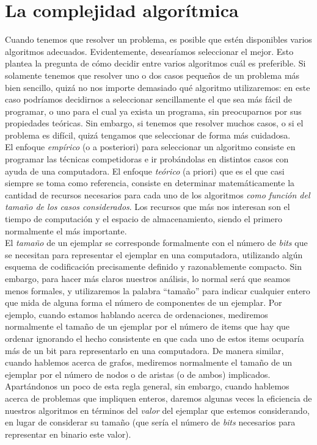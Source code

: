 \chapter{La complejidad algorítmica}
\label{chap:notacion-asintotica}

Cuando tenemos que resolver un problema, es posible que estén disponibles varios algoritmos adecuados. Evidentemente, desearíamos seleccionar el mejor. Esto plantea la pregunta de cómo decidir entre varios algoritmos cuál es preferible. Si solamente tenemos que resolver uno o dos casos pequeños de un problema más bien sencillo, quizá no nos importe demasiado qué algoritmo utilizaremos: en este caso podríamos decidirnos a seleccionar sencillamente el que sea más fácil de programar, o uno para el cual ya exista un programa, sin preocuparnos por sus propiedades teóricas. Sin embargo, si tenemos que resolver muchos casos, o si el problema es difícil, quizá tengamos que seleccionar de forma más cuidadosa.\\

El enfoque \emph{empírico} (o a posteriori) para seleccionar un algoritmo consiste en programar las técnicas competidoras e ir probándolas en distintos casos con ayuda de una computadora. El enfoque \emph{teórico} (a priori) que es el que casi siempre se toma como referencia, consiste en determinar matemáticamente la cantidad de recursos necesarios para cada uno de los algoritmos \emph{como función del tamaño de los casos considerados}. Los recursos que más nos interesan son el tiempo de computación y el espacio de almacenamiento, siendo el primero normalmente el más importante. \\

El \emph{tamaño} de un ejemplar se corresponde formalmente con el número de \emph{bits} que se necesitan para representar el ejemplar en una computadora, utilizando algún esquema de codificación precisamente definido y razonablemente compacto. Sin embargo, para hacer más claros nuestros análisis, lo normal será que seamos menos formales, y utilizaremos la palabra ``tamaño'' para indicar cualquier entero que mida de alguna forma el número de componentes de un ejemplar. Por ejemplo, cuando estamos hablando acerca de ordenaciones, mediremos normalmente el tamaño de un ejemplar por el número de items que hay que ordenar ignorando el hecho consistente en que cada uno de estos items ocuparía más de un bit para representarlo en una computadora. De manera similar, cuando hablemos acerca de grafos, mediremos normalmente el tamaño de un ejemplar por el número de nodos o de aristas (o de ambos) implicados. Apartándonos un poco de esta regla general, sin embargo, cuando hablemos acerca de problemas que impliquen enteros, daremos algunas veces la eficiencia de nuestros algoritmos en términos del \emph{valor} del ejemplar que estemos considerando, en lugar de considerar su tamaño (que sería el número de \emph{bits} necesarios para representar en binario este valor).\\

